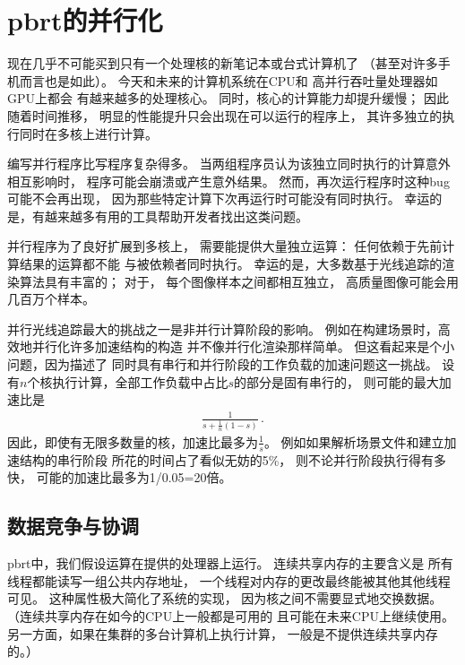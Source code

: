 \section{pbrt的并行化}\label{sec:pbrt的并行化}

现在几乎不可能买到只有一个处理核的新笔记本或台式计算机了
（甚至对许多手机而言也是如此）。
今天和未来的计算机系统在CPU和
高并行吞吐量处理器如GPU上都会
有越来越多的处理核心。
同时，核心的计算能力却提升缓慢；
因此随着时间推移，
明显的性能提升只会出现在可以运行的程序上，
其许多独立的执行同时在多核上进行计算。

编写并行程序比写程序复杂得多。
当两组程序员认为该独立同时执行的计算意外相互影响时，
程序可能会崩溃或产生意外结果。
然而，再次运行程序时这种bug可能不会再出现，
因为那些特定计算下次再运行时可能没有同时执行。
幸运的是，有越来越多有用的工具帮助开发者找出这类问题。

并行程序为了良好扩展到多核上，
需要能提供大量独立运算：
任何依赖于先前计算结果的运算都不能
与被依赖者同时执行。
幸运的是，大多数基于光线追踪的渲染算法具有丰富的；
对于，
每个图像样本之间都相互独立，
高质量图像可能会用几百万个样本。

并行光线追踪最大的挑战之一是非并行计算阶段的影响。
例如在构建场景时，高效地并行化许多加速结构的构造
并不像并行化渲染那样简单。
但这看起来是个小问题，因为描述了
同时具有串行和并行阶段的工作负载的加速问题这一挑战。
设有$n$个核执行计算，全部工作负载中占比$s$的部分是固有串行的，
则可能的最大加速比是
\begin{align*}
    \frac{1}{\displaystyle s+\frac{1}{n}(1-s)}\, .
\end{align*}
因此，即使有无限多数量的核，加速比最多为$\displaystyle\frac{1}{s}$。
例如如果解析场景文件和建立加速结构的串行阶段
所花的时间占了看似无妨的5\%，
则不论并行阶段执行得有多快，
可能的加速比最多为1/0.05=20倍。

\subsection{数据竞争与协调}
pbrt中，我们假设运算在提供的处理器上运行。
连续共享内存的主要含义是
所有线程都能读写一组公共内存地址，
一个线程对内存的更改最终能被其他其他线程可见。
这种属性极大简化了系统的实现，
因为核之间不需要显式地交换数据。
（连续共享内存在如今的CPU上一般都是可用的
且可能在未来CPU上继续使用。
另一方面，如果在集群的多台计算机上执行计算，
一般是不提供连续共享内存的。）

